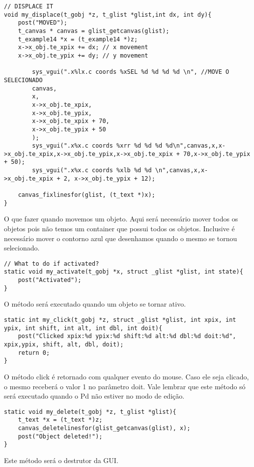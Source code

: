 \begin{lstlisting}
// DISPLACE IT
void my_displace(t_gobj *z, t_glist *glist,int dx, int dy){
	post("MOVED");
	t_canvas * canvas = glist_getcanvas(glist);
	t_example14 *x = (t_example14 *)z;
	x->x_obj.te_xpix += dx; // x movement
	x->x_obj.te_ypix += dy; // y movement

        sys_vgui(".x%lx.c coords %xSEL %d %d %d %d \n", //MOVE O SELECIONADO
		canvas,
		x,
		x->x_obj.te_xpix,
		x->x_obj.te_ypix,
		x->x_obj.te_xpix + 70,
		x->x_obj.te_ypix + 50
		);
        sys_vgui(".x%x.c coords %xrr %d %d %d %d\n",canvas,x,x->x_obj.te_xpix,x->x_obj.te_ypix,x->x_obj.te_xpix + 70,x->x_obj.te_ypix + 50);
        sys_vgui(".x%x.c coords %xlb %d %d \n",canvas,x,x->x_obj.te_xpix + 2, x->x_obj.te_ypix + 12);

	canvas_fixlinesfor(glist, (t_text *)x);
}
\end{lstlisting}

O que fazer quando movemos um objeto. Aqui será necessário mover todos os objetos pois não temos um
container que possui todos os objetos. Inclusive é necessário mover o contorno azul que desenhamos
quando o mesmo se tornou selecionado.

\begin{lstlisting}
// What to do if activated?
static void my_activate(t_gobj *x, struct _glist *glist, int state){
	post("Activated");
}
\end{lstlisting}

O método será executado quando um objeto se tornar ativo.

\begin{lstlisting}
static int my_click(t_gobj *z, struct _glist *glist, int xpix, int ypix, int shift, int alt, int dbl, int doit){
	post("Clicked xpix:%d ypix:%d shift:%d alt:%d dbl:%d doit:%d", xpix,ypix, shift, alt, dbl, doit);
	return 0;
}
\end{lstlisting}

O método click é retornado com qualquer evento do mouse. Caso ele seja clicado, o mesmo receberá o valor 1 no parâmetro doit.
Vale lembrar que este método só será executado quando o Pd não estiver no modo de edição.

\begin{lstlisting}
static void my_delete(t_gobj *z, t_glist *glist){
	t_text *x = (t_text *)z;
	canvas_deletelinesfor(glist_getcanvas(glist), x);
	post("Object deleted!");
} 
\end{lstlisting}

Este método será o destrutor da GUI.

